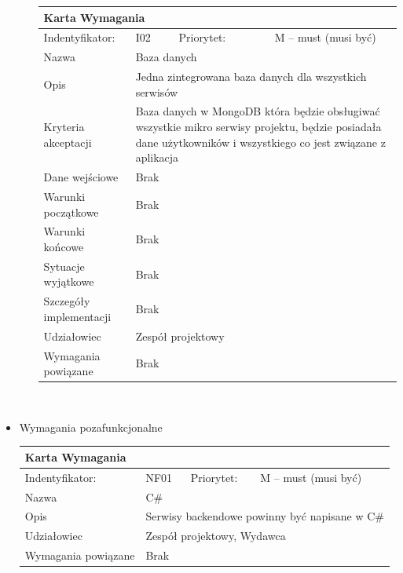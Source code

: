 \documentclass[a4paper,11pt]{report}
\begin{document}
\begin{itemize}
\begin{itemize}
		\begin{tabular}{|p{3cm}|p{2cm}|p{2cm}|p{6cm}|}
		\hline
		\multicolumn{4}{|p{12 cm}|}{Karta Wymagania}\\
		\hline
		Indentyfikator: & I02 & Priorytet: & M – must (musi być)\\
		\hline
		Nazwa & \multicolumn{3}{|p{10 cm}|}{Baza danych}\\
		\hline
		Opis & \multicolumn{3}{|p{10 cm}|}{Jedna zintegrowana baza danych dla wszystkich serwisów}\\
		\hline
		Kryteria akceptacji & \multicolumn{3}{|p{10 cm}|}{Baza danych w MongoDB która będzie obsługiwać wszystkie mikro serwisy projektu, będzie posiadała dane użytkowników i wszystkiego co jest związane z aplikacja}\\
		\hline
		Dane wejściowe & \multicolumn{3}{|p{10 cm}|}{Brak}\\
		\hline
		Warunki początkowe & \multicolumn{3}{|p{10 cm}|}{Brak}\\
		\hline
		Warunki końcowe & \multicolumn{3}{|p{10 cm}|}{Brak}\\
		\hline
		Sytuacje wyjątkowe & \multicolumn{3}{|p{10 cm}|}{Brak}\\
		\hline
		Szczegóły implementacji & \multicolumn{3}{|p{10 cm}|}{Brak}\\
		\hline
		Udziałowiec & \multicolumn{3}{|p{10 cm}|}{Zespół projektowy}\\
		\hline
		Wymagania powiązane & \multicolumn{3}{|p{10 cm}|}{Brak}\\
		\hline
		\end{tabular}\\
	\end{itemize}
	\item Wymagania pozafunkcjonalne\\
	\begin{tabular}{|p{3cm}|p{2cm}|p{2cm}|p{6cm}|}
		\hline
		\multicolumn{4}{|p{12 cm}|}{Karta Wymagania}\\
		\hline
		Indentyfikator: & NF01 & Priorytet: & M – must (musi być)\\
		\hline
		Nazwa & \multicolumn{3}{|p{10 cm}|}{C\#}\\
		\hline
		Opis & \multicolumn{3}{|p{10 cm}|}{Serwisy backendowe powinny być napisane w C\#}\\
		\hline
		Udziałowiec & \multicolumn{3}{|p{10 cm}|}{Zespół projektowy, Wydawca}\\
		\hline
		Wymagania powiązane & \multicolumn{3}{|p{10 cm}|}{Brak}\\

\end{tabular}
\end{itemize}
\end{document}
